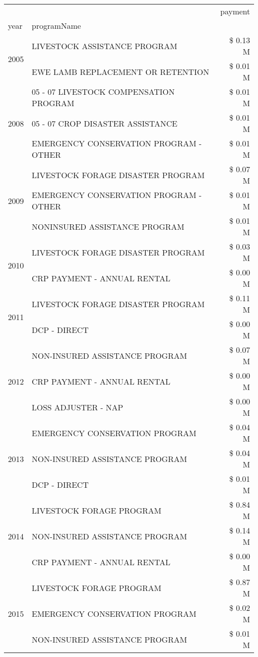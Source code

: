 \begin{tabular}{llr}
\toprule
 &  & payment \\
year & programName &  \\
\midrule
\multirow[t]{2}{*}{2005} & LIVESTOCK ASSISTANCE PROGRAM & \$ 0.13 M \\
 & EWE LAMB REPLACEMENT OR RETENTION & \$ 0.01 M \\
\cline{1-3}
\multirow[t]{3}{*}{2008} & 05 - 07 LIVESTOCK COMPENSATION PROGRAM & \$ 0.01 M \\
 & 05 - 07 CROP DISASTER ASSISTANCE & \$ 0.01 M \\
 & EMERGENCY CONSERVATION PROGRAM - OTHER & \$ 0.01 M \\
\cline{1-3}
\multirow[t]{3}{*}{2009} & LIVESTOCK FORAGE DISASTER  PROGRAM & \$ 0.07 M \\
 & EMERGENCY CONSERVATION PROGRAM - OTHER & \$ 0.01 M \\
 & NONINSURED ASSISTANCE PROGRAM & \$ 0.01 M \\
\cline{1-3}
\multirow[t]{2}{*}{2010} & LIVESTOCK FORAGE DISASTER PROGRAM & \$ 0.03 M \\
 & CRP PAYMENT - ANNUAL RENTAL & \$ 0.00 M \\
\cline{1-3}
\multirow[t]{2}{*}{2011} & LIVESTOCK FORAGE DISASTER PROGRAM & \$ 0.11 M \\
 & DCP - DIRECT & \$ 0.00 M \\
\cline{1-3}
\multirow[t]{3}{*}{2012} & NON-INSURED ASSISTANCE PROGRAM & \$ 0.07 M \\
 & CRP PAYMENT - ANNUAL RENTAL & \$ 0.00 M \\
 & LOSS ADJUSTER - NAP & \$ 0.00 M \\
\cline{1-3}
\multirow[t]{3}{*}{2013} & EMERGENCY CONSERVATION PROGRAM & \$ 0.04 M \\
 & NON-INSURED ASSISTANCE PROGRAM & \$ 0.04 M \\
 & DCP - DIRECT & \$ 0.01 M \\
\cline{1-3}
\multirow[t]{3}{*}{2014} & LIVESTOCK FORAGE PROGRAM & \$ 0.84 M \\
 & NON-INSURED ASSISTANCE PROGRAM & \$ 0.14 M \\
 & CRP PAYMENT - ANNUAL RENTAL & \$ 0.00 M \\
\cline{1-3}
\multirow[t]{3}{*}{2015} & LIVESTOCK FORAGE PROGRAM & \$ 0.87 M \\
 & EMERGENCY CONSERVATION PROGRAM & \$ 0.02 M \\
 & NON-INSURED ASSISTANCE PROGRAM & \$ 0.01 M \\

\end{tabular}
